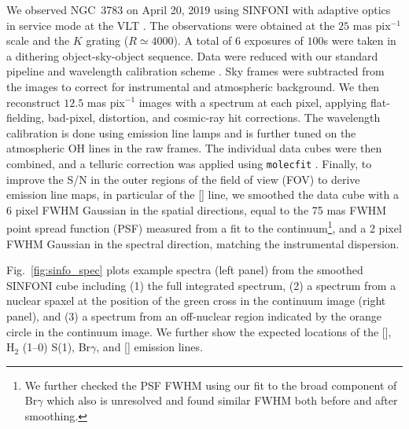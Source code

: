 \documentclass[longauth,]{aa}
\newcommand{\brg}{Br$\gamma$}
\newcommand{\caviii}{[\ion{Ca}{viii}]}
\newcommand{\sivi}{[\ion{Si}{vi}]}
\begin{document}
We observed NGC~3783 on April 20, 2019 using SINFONI with adaptive optics in service mode at the VLT \citep{Eisenhauer:2003eh, Bonnet:2004aa}. The observations were obtained at the $25$ mas pix$^{-1}$ scale and the $K$ grating ($R \simeq 4000$). A total of 6 exposures of $100$s were taken in a dithering object-sky-object sequence. Data were reduced with our standard pipeline and wavelength calibration scheme \citep[SPRED,][]{Schreiber:2004aa,Abuter:2006aa}. Sky frames were subtracted from the images to correct for instrumental and atmospheric background. We then reconstruct $12.5$ mas pix$^{-1}$ images with a spectrum at each pixel, applying flat-fielding, bad-pixel, distortion, and cosmic-ray hit corrections. The wavelength calibration is done using emission line lamps and is further tuned on the atmospheric OH lines in the raw frames. The individual data cubes were then combined, and a telluric correction was applied using \texttt{molecfit} \citep{Smette:2015aa,Kausch:2015aa}. Finally, to improve the S/N in the outer regions of the field of view (FOV) to derive emission line maps, in particular of the \caviii{} line, we smoothed the data cube with a 6 pixel FWHM Gaussian in the spatial directions, equal to the 75 mas FWHM point spread function (PSF) measured from a fit to the continuum\footnote{We further checked the PSF FWHM using our fit to the broad component of \brg{} which also is unresolved and found similar FWHM both before and after smoothing.}, and a 2 pixel FWHM Gaussian in the spectral direction, matching the instrumental dispersion.

Fig.~\ref{fig:sinfo_spec} plots example spectra (left panel) from the smoothed SINFONI cube including (1) the full integrated spectrum, (2) a spectrum from a nuclear spaxel at the position of the green cross in the continuum image (right panel), and (3) a spectrum from an off-nuclear region indicated by the orange circle in the continuum image. We further show the expected locations of the \sivi, H$_{2}$ (1--0) S(1), \brg, and \caviii{} emission lines.
\end{document}
